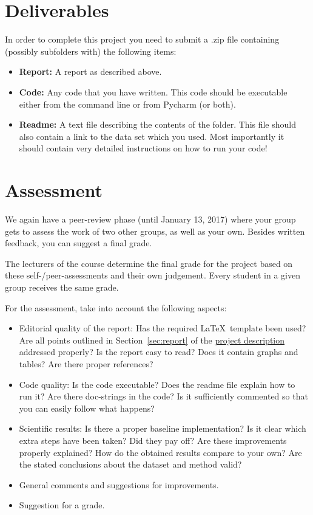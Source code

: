 \documentclass[11pt, leqno, a4paper]{article}
\begin{document}
\section{Deliverables}
In order to complete this project you need to submit a .zip file
containing (possibly subfolders with) the following items:
\begin{itemize}
\item \textbf{Report:} A report as described above.
\item \textbf{Code:} Any code that you have written. This code should be executable either from the command line or from Pycharm (or both).
\item \textbf{Readme:} A text file describing the contents of the folder. This file should also contain a link to the data set which you used. Most importantly
it should contain very detailed instructions on how to run your code!
\end{itemize}

\section{Assessment}
We again have a peer-review phase (until January 13, 2017) where your group gets to assess the
work of two other groups, as well as your own. Besides written
feedback, you can suggest a final grade.

The lecturers of the course determine the final grade for the project based on these
self-/peer-assessments and their own judgement. Every student in a given group
receives the same grade.

For the assessment, take into account the following aspects:
\begin{itemize}
\item Editorial quality of the report: Has the required \LaTeX\  
  template been used? Are all points outlined in
  Section~\ref{sec:report} of the \href{https://github.com/BasicProbability/BasicProbability.github.io/raw/master/Homework/Programming/2016-17/FinalProject/finalProject.pdf}{project description} addressed
  properly? Is the report easy to read? Does it contain graphs and
  tables? Are there proper references?
\item Code quality: Is the code executable? Does the readme file
  explain how to run it? Are there doc-strings in the code? Is it
  sufficiently commented so that you can easily follow what happens?
\item Scientific results: Is there a proper baseline implementation?
  Is it clear which extra steps have been taken? Did they pay off? Are
  these improvements properly explained? How do the obtained results compare to
  your own? Are the stated conclusions about the dataset and method valid? 
\item General comments and suggestions for improvements.
\item Suggestion for a grade.
\end{itemize}
\end{document}
